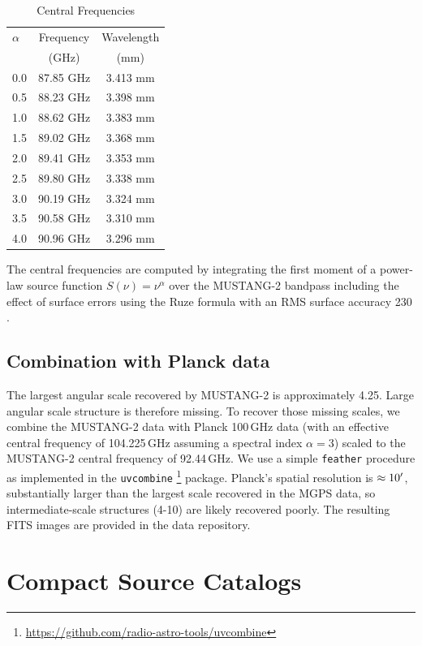 \documentclass[twocolumn]{aastex62}
\newcommand{\MUSTANG}{MUSTANG-2\xspace}
\begin{document}
\begin{table}[htp]
\centering
    \caption{Central Frequencies}
\begin{tabular}{lcc}
    \label{tab:centralfreq}
$\alpha$ & Frequency & Wavelength\\
         & (GHz)       & (mm) \\
\hline
0.0 & 87.85 GHz & 3.413 mm\\
0.5 & 88.23 GHz & 3.398 mm\\
1.0 & 88.62 GHz & 3.383 mm\\
1.5 & 89.02 GHz & 3.368 mm\\
2.0 & 89.41 GHz & 3.353 mm\\
2.5 & 89.80 GHz & 3.338 mm\\
3.0 & 90.19 GHz & 3.324 mm\\
3.5 & 90.58 GHz & 3.310 mm\\
4.0 & 90.96 GHz & 3.296 mm\\
\hline
\end{tabular}
\par The central frequencies are computed by integrating the first moment of a
power-law source function $S(\nu) = \nu^{\alpha}$ over the \MUSTANG
bandpass including the effect of surface errors using the Ruze formula
with an RMS surface accuracy 230 \um \citep{Frayer2018a}.

\end{table}

\subsection{Combination with Planck data\label{sec:feather}}
The largest angular scale recovered by \MUSTANG is approximately 4.25\arcmin.
Large angular scale structure is therefore missing.  To recover those
missing scales, we combine the \MUSTANG data with
Planck 100\,GHz data (with an effective central frequency of 104.225\,GHz
assuming a spectral index $\alpha=3$) scaled to the \MUSTANG central frequency
of 92.44\,GHz.  We use a simple \texttt{feather} procedure \citep{Cotton2017a}
as implemented in the \texttt{uvcombine}
\footnote{\url{https://github.com/radio-astro-tools/uvcombine}} package.
Planck's spatial resolution is $\approx10\mbox{$^\prime$}$, substantially larger
than the largest scale recovered in the MGPS data, so intermediate-scale
structures (4-10\arcmin) are likely recovered poorly.
The resulting FITS images are provided in the data repository.

\section{Compact Source Catalogs}
\end{document}
